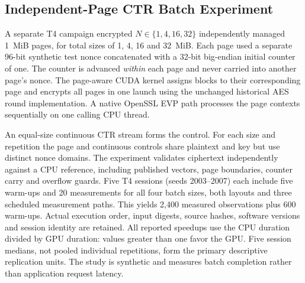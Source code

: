 \subsection{Independent-Page CTR Batch Experiment}
\label{sec:page-method}
A separate T4 campaign encrypted $N\in\{1,4,16,32\}$ independently managed
1~MiB pages, for total sizes of 1, 4, 16 and 32~MiB. Each page used a separate
96-bit synthetic test nonce concatenated with a 32-bit big-endian initial
counter of one. The counter is advanced \emph{within} each page and never
carried into another page's nonce. The page-aware CUDA kernel assigns blocks
to their corresponding page and encrypts all pages in one launch using the
unchanged historical AES round implementation. A native OpenSSL EVP path
processes the page contexts sequentially on one calling CPU thread.

An equal-size continuous CTR stream forms the control. For each size and
repetition the page and continuous controls share plaintext and key but use
distinct nonce domains. The experiment validates ciphertext independently
against a CPU reference, including published vectors, page boundaries, counter
carry and overflow guards. Five T4 sessions (seeds 2003--2007) each include
five warm-ups and 20 measurements for all four batch sizes, both layouts and
three scheduled measurement paths. This yields 2,400 measured observations
plus 600 warm-ups. Actual execution order, input digests, source hashes,
software versions and session identity are retained. All reported speedups
use the CPU duration divided by GPU duration: values greater than one favor
the GPU. Five session medians, not pooled individual repetitions, form the
primary descriptive replication units. The study is synthetic and measures
batch completion rather than application request latency.
